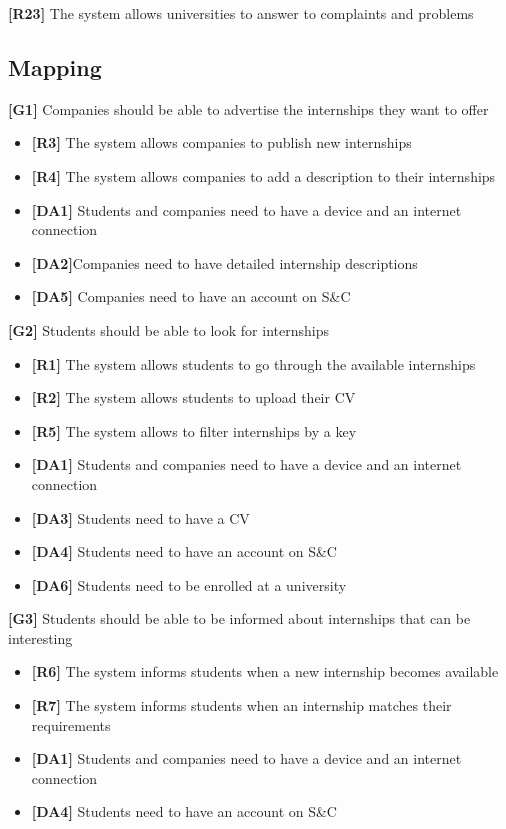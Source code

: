 \textbf{[R23]} The system allows universities to answer to complaints and problems


\subsection{Mapping}

\textbf{[G1]} Companies should be able to advertise the internships they want to offer 
\begin{itemize}
    \item \textbf{[R3]} The system allows companies to publish new internships
    \item \textbf{[R4]} The system allows companies to add a description to their internships
    
    \item \textbf{[DA1]} Students and companies need to have a device and an internet connection
    \item \textbf{[DA2]}Companies need to have detailed internship descriptions
    \item \textbf{[DA5]} Companies need to have an account on S\&C
\end{itemize}

\textbf{[G2]} Students should be able to look for internships
\begin{itemize}
    \item \textbf{[R1]} The system allows students to go through the available internships
    \item \textbf{[R2]} The system allows students to upload their CV
    \item \textbf{[R5]} The system allows to filter internships by a key
    
    \item \textbf{[DA1]} Students and companies need to have a device and an internet connection
    \item \textbf{[DA3]} Students need to have a CV
    \item \textbf{[DA4]} Students need to have an account on S\&C
    \item \textbf{[DA6]} Students need to be enrolled at a university
\end{itemize}

\textbf{[G3]} Students should be able to be informed about internships that can be interesting
\begin{itemize}
    
    \item \textbf{[R6]} The system informs students when a new internship becomes available
    \item \textbf{[R7]} The system informs students when an internship matches their requirements

    \item \textbf{[DA1]} Students and companies need to have a device and an internet
    connection
    \item \textbf{[DA4]} Students need to have an account on S\&C
\end{itemize}

